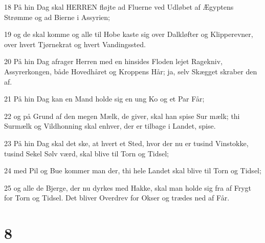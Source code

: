 \par 18 På hin Dag skal HERREN fløjte ad Fluerne ved Udløbet af Ægyptens Strømme og ad Bierne i Assyrien;
\par 19 og de skal komme og alle til Hobe kaste sig over Dalkløfter og Klipperevner, over hvert Tjørnekrat og hvert Vandingssted.
\par 20 På hin Dag afrager Herren med en hinsides Floden lejet Ragekniv, Assyrerkongen, både Hovedhåret og Kroppens Hår; ja, selv Skægget skraber den af.
\par 21 På hin Dag kan en Mand holde sig en ung Ko og et Par Får;
\par 22 og på Grund af den megen Mælk, de giver, skal han spise Sur mælk; thi Surmælk og Vildhonning skal enhver, der er tilbage i Landet, spise.
\par 23 På hin Dag skal det ske, at hvert et Sted, hvor der nu er tusind Vinstokke, tusind Sekel Sølv værd, skal blive til Torn og Tidsel;
\par 24 med Pil og Bue kommer man der, thi hele Landet skal blive til Torn og Tidsel;
\par 25 og alle de Bjerge, der nu dyrkes med Hakke, skal man holde sig fra af Frygt for Torn og Tidsel. Det bliver Overdrev for Okser og trædes ned af Får.

\chapter{8}

